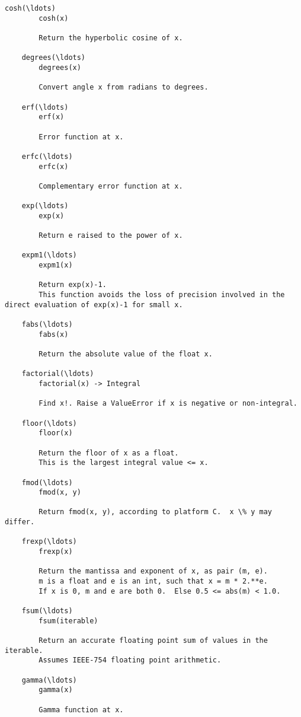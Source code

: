 \documentclass{article}
\begin{document}
\begin{Verbatim}[commandchars=\\\{\}]
    cosh(\ldots)
        cosh(x)
        
        Return the hyperbolic cosine of x.
    
    degrees(\ldots)
        degrees(x)
        
        Convert angle x from radians to degrees.
    
    erf(\ldots)
        erf(x)
        
        Error function at x.
    
    erfc(\ldots)
        erfc(x)
        
        Complementary error function at x.
    
    exp(\ldots)
        exp(x)
        
        Return e raised to the power of x.
    
    expm1(\ldots)
        expm1(x)
        
        Return exp(x)-1.
        This function avoids the loss of precision involved in the direct evaluation of exp(x)-1 for small x.
    
    fabs(\ldots)
        fabs(x)
        
        Return the absolute value of the float x.
    
    factorial(\ldots)
        factorial(x) -> Integral
        
        Find x!. Raise a ValueError if x is negative or non-integral.
    
    floor(\ldots)
        floor(x)
        
        Return the floor of x as a float.
        This is the largest integral value <= x.
    
    fmod(\ldots)
        fmod(x, y)
        
        Return fmod(x, y), according to platform C.  x \% y may differ.
    
    frexp(\ldots)
        frexp(x)
        
        Return the mantissa and exponent of x, as pair (m, e).
        m is a float and e is an int, such that x = m * 2.**e.
        If x is 0, m and e are both 0.  Else 0.5 <= abs(m) < 1.0.
    
    fsum(\ldots)
        fsum(iterable)
        
        Return an accurate floating point sum of values in the iterable.
        Assumes IEEE-754 floating point arithmetic.
    
    gamma(\ldots)
        gamma(x)
        
        Gamma function at x.
    

\end{Verbatim}
\end{document}
